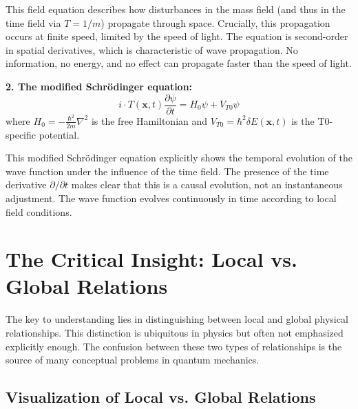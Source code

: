 	This field equation describes how disturbances in the mass field (and thus in the time field via $T = 1/m$) propagate through space. Crucially, this propagation occurs at finite speed, limited by the speed of light. The equation is second-order in spatial derivatives, which is characteristic of wave propagation. No information, no energy, and no effect can propagate faster than the speed of light.
	
	\textbf{2. The modified Schrödinger equation:}
	\begin{equation}
		i \cdot T(\mathbf{x},t) \frac{\partial \psi}{\partial t} = H_0 \psi + V_{T0} \psi \label{eq:schroedinger}
	\end{equation}
	where $H_0 = -\frac{\hbar^2}{2m}\nabla^2$ is the free Hamiltonian and $V_{T0} = \hbar^2 \delta E(\mathbf{x},t)$ is the T0-specific potential.
	
	This modified Schrödinger equation explicitly shows the temporal evolution of the wave function under the influence of the time field. The presence of the time derivative $\partial/\partial t$ makes clear that this is a causal evolution, not an instantaneous adjustment. The wave function evolves continuously in time according to local field conditions.
	
	\section{The Critical Insight: Local vs. Global Relations}
	
	The key to understanding lies in distinguishing between local and global physical relationships. This distinction is ubiquitous in physics but often not emphasized explicitly enough. The confusion between these two types of relationships is the source of many conceptual problems in quantum mechanics.
	
	\subsection{Visualization of Local vs. Global Relations}
	
